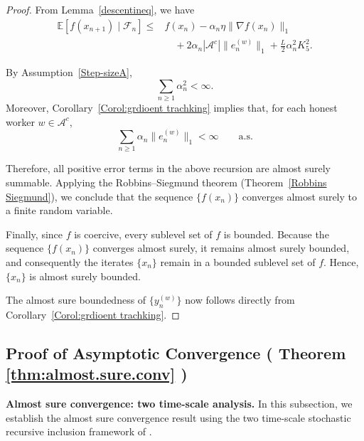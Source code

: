 \documentclass{article}
\begin{document}
\begin{proof}
From Lemma~\ref{descentineq}, we have
\[
\begin{aligned}
    \mathbb{E}[f(x_{n+1}) \mid \mathcal{F}_n]
    \le{}&
    f(x_n)
    -
    \alpha_n \eta \|\nabla f(x_n)\|_1
    \\
    &\quad
    +
    2\alpha_n |\mathcal{A}^c| \|e_n^{(w)}\|_1
    +
    \frac{L}{2}\alpha_n^2 K_5^2 .
\end{aligned}
\]

By Assumption~\ref{Step-sizeA},
\[
\sum_{n\ge1} \alpha_n^2 < \infty.
\]
Moreover, Corollary~\ref{Corol:grdioent trachking} implies that, for each honest worker $w \in \mathcal{A}^c$,
\[
\sum_{n\ge1}
\alpha_n \|e_n^{(w)}\|_1
<
\infty
\qquad \text{a.s.}
\]

Therefore, all positive error terms in the above recursion are almost surely summable. Applying the Robbins--Siegmund theorem (Theorem~\ref{Robbins Siegmund}), we conclude that the sequence $\{f(x_n)\}$ converges almost surely to a finite random variable.

Finally, since $f$ is coercive, every sublevel set of $f$ is bounded. Because the sequence $\{f(x_n)\}$ converges almost surely, it remains almost surely bounded, and consequently the iterates $\{x_n\}$ remain in a bounded sublevel set of $f$. Hence, $\{x_n\}$
is almost surely bounded.

The almost sure boundedness of $\{y_n^{(w)}\}$ now follows directly from Corollary~\ref{Corol:grdioent trachking}.
\end{proof}




\subsection{Proof of Asymptotic Convergence ( Theorem \ref{thm:almost.sure.conv} )}

\textbf{Almost sure convergence: two time-scale analysis.}
In this subsection, we establish the almost sure convergence result using the
two time-scale stochastic recursive inclusion framework of \cite{yaji2020stochastic}. 
\end{document}
